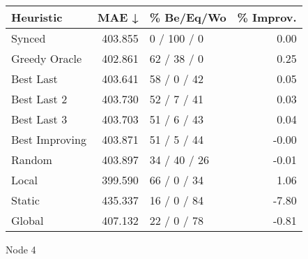 \begin{tabular}{lrlr}
\toprule
\textbf{Heuristic} & \textbf{MAE ↓} & \textbf{\% Be/Eq/Wo} & \textbf{\% Improv.} \\
\midrule
            Synced &        403.855 &          0 / 100 / 0 &                0.00 \\
     Greedy Oracle &        402.861 &          62 / 38 / 0 &                0.25 \\
         Best Last &        403.641 &          58 / 0 / 42 &                0.05 \\
       Best Last 2 &        403.730 &          52 / 7 / 41 &                0.03 \\
       Best Last 3 &        403.703 &          51 / 6 / 43 &                0.04 \\
    Best Improving &        403.871 &          51 / 5 / 44 &               -0.00 \\
            Random &        403.897 &         34 / 40 / 26 &               -0.01 \\
             Local &        399.590 &          66 / 0 / 34 &                1.06 \\
            Static &        435.337 &          16 / 0 / 84 &               -7.80 \\
            Global &        407.132 &          22 / 0 / 78 &               -0.81 \\
\bottomrule
\end{tabular}
\caption{Node 4}
\label{tab:non_lr01_le2_bs4_4}
